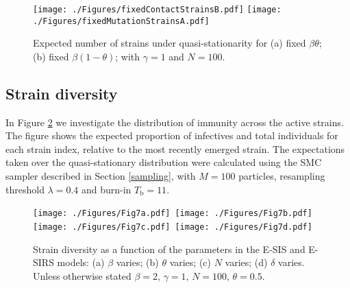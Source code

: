 \documentclass[review]{elsarticle}
\begin{document}
\begin{figure}[h!]
	\centering
  		\texttt{[image: ./Figures/fixedContactStrainsB.pdf]}
  		\texttt{[image: ./Figures/fixedMutationStrainsA.pdf]}
	\caption{Expected number of strains under quasi-stationarity for (a) fixed $\beta\theta$; (b) fixed $\beta(1-\theta)$; with $\gamma = 1$ and $N=100$. 
	}
	\label{fig: fix bt}
\end{figure}

\subsection{Strain diversity}

In Figure \ref{fig: div} we investigate the distribution of immunity across the active strains.  The figure shows the expected proportion of infectives and total individuals for each strain index, relative to the most recently emerged strain. The expectations taken over the quasi-stationary distribution were calculated using the SMC sampler described in Section \ref{sampling}, with $M=100$ particles, resampling threshold $\lambda=0.4$ and burn-in $T_\text{b}=11$.

\begin{figure}
	\centering
 		\mbox{\texttt{[image: ./Figures/Fig7a.pdf]}
  		\texttt{[image: ./Figures/Fig7b.pdf]}}
  		\mbox{\texttt{[image: ./Figures/Fig7c.pdf]}
  		\texttt{[image: ./Figures/Fig7d.pdf]}}
	\caption{Strain diversity as a function of the parameters in the E-SIS and E-SIRS models: (a) $\beta$ varies; (b) $\theta$ varies; (c) $N$ varies; (d) $\delta$ varies. Unless otherwise stated $\beta=2$, $\gamma=1$, $N=100$, $\theta=0.5$.}
	\label{fig: div}
\end{figure}
\end{document}
